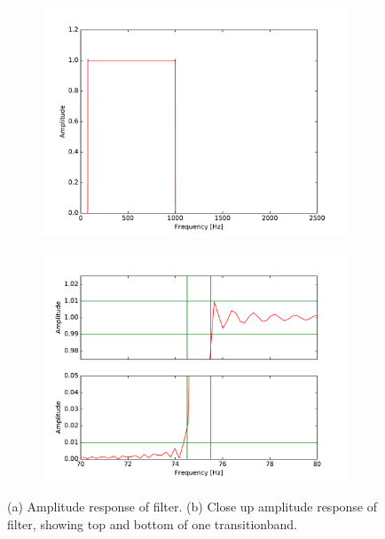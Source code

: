 \begin{figure}[h]
\centering
\begin{subfigure}{0.49\textwidth}
\centering
\includegraphics[width=\textwidth]{figures/filtertest/freq_response1.pdf}
\caption{}
\label{fig:freq_filt1}
\end{subfigure}
\begin{subfigure}{0.49\textwidth}
\centering
\includegraphics[width=\textwidth]{figures/filtertest/freq_response2.pdf}
\caption{}
\label{fig:freq_filt2}
\end{subfigure}
\caption{(a) Amplitude response of filter. (b) Close up amplitude response of filter, showing top and bottom of one transitionband.}
\label{fig:freq_filt}
\end{figure}


